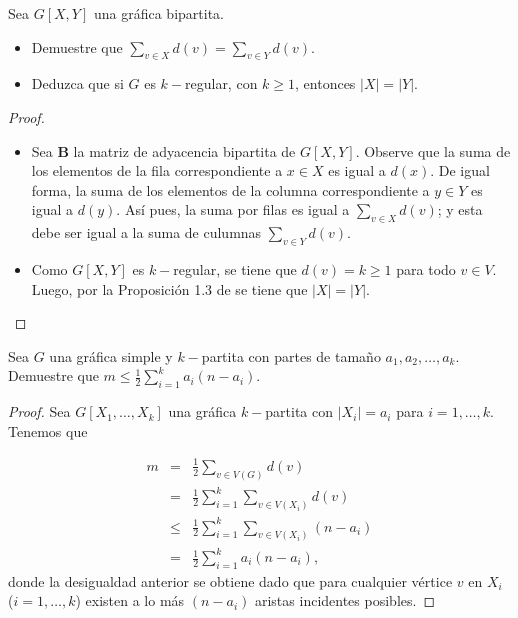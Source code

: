 \documentclass[12pt]{article}
\newenvironment{problem}[2][Problema]{\begin{trivlist}
\item[\hskip \labelsep {\bfseries #1}\hskip \labelsep {\bfseries #2.}]}{\end{trivlist}}
\begin{document}

\begin{problem}{1.1.9} Sea $G[X,Y]$ una gráfica bipartita.
\begin{itemize}
    \item[a)] Demuestre que $\sum_{v\in X} d(v) = \sum_{v\in Y} d(v).$
    \item[b)] Deduzca que si $G$ es $k-$regular, con $k\geq 1$, entonces $\lvert X \rvert = \lvert Y \rvert.$
\end{itemize}
\end{problem}
\begin{proof}
\text{ }
\begin{itemize}
    \item[a)] Sea $\boldsymbol{B}$ la matriz de adyacencia bipartita de $G[X,Y]$. Observe que la suma de los elementos de la fila correspondiente a $x\in X$ es igual a $d(x)$. De igual forma, la suma de los elementos de la columna correspondiente a $y\in Y$ es igual a $d(y).$ Así pues, la suma por filas es igual a $\sum_{v\in X} d(v)$; y esta debe ser igual a la suma de culumnas $\sum_{v \in Y} d(v)$.
    
    \item[b)] Como $G[X, Y]$ es $k-$regular, se tiene que $d(v) = k \geq 1$ para todo $v \in V$. Luego, por la Proposición 1.3 de \cite{10.5555/1481153} se tiene que $\lvert X \rvert = \lvert Y \rvert$.
\end{itemize}
\end{proof}

\begin{problem}{1.1.10} Sea $G$ una gráfica simple y $k-$partita con partes de tamaño $a_1, a_2, \ldots, a_k.$ Demuestre que $m\leq \frac{1}{2} \sum_{i=1}^k a_i(n-a_i).$
\end{problem}
\begin{proof}
Sea $G[X_1,\ldots, X_k]$ una gráfica $k-$partita con $\lvert X_i \rvert = a_i$ para $i=1,\ldots,k$. Tenemos que

\begin{eqnarray*}
m &=& \frac{1}{2} \sum_{v \in V(G)} d(v)\\
&=& \frac{1}{2} \sum_{i=1}^k \sum_{v \in V(X_i)} d(v)\\
&\leq& \frac{1}{2} \sum_{i=1}^k \sum_{v \in V(X_i)} (n - a_i)\\ 
&=& \frac{1}{2} \sum_{i=1}^k a_i(n-a_i),
\end{eqnarray*}
donde la desigualdad anterior se obtiene dado que para cualquier vértice $v$ en $X_i$ ($i=1, \ldots, k$) existen a lo más $(n-a_i)$ aristas incidentes posibles.
\end{proof}
\end{document}
